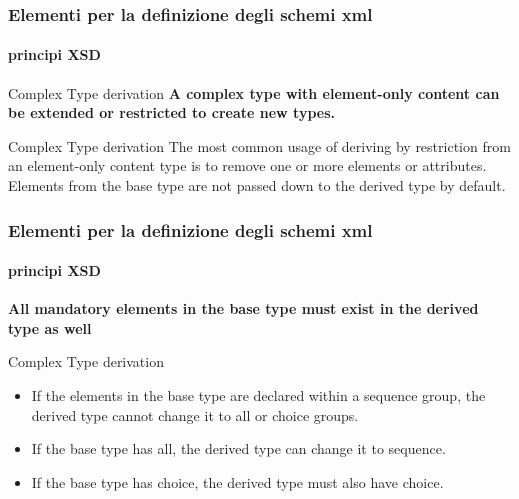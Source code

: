 

\begin{frame}
	\frametitle{Elementi per la definizione degli schemi xml}
	\framesubtitle{principi XSD}
	\addtocounter{nframe}{1}

	\begin{block}{Complex Type derivation}
		\textbf{A complex type with element-only content can be extended or restricted to create new types.}
	\end{block}

	\begin{block}{Complex Type derivation}
		The most common usage of deriving by restriction from an element-only content type is to remove one or more elements or attributes. Elements from the base type are not passed down to the derived type by default.
	\end{block}
\end{frame}


\begin{frame}
	\frametitle{Elementi per la definizione degli schemi xml}
	\framesubtitle{principi XSD}
	\addtocounter{nframe}{1}

	
		\textbf{All mandatory elements in the base type must exist in the derived type as well}
	

	\begin{block}{Complex Type derivation}
		\begin{itemize}
			\item If the elements in the base type are declared within a sequence group, the derived type cannot change it to all or choice groups.
			\item If the base type has all, the derived type can change it to sequence.
			\item If the base type has choice, the derived type must also have choice.
		\end{itemize}
	\end{block}
\end{frame}

